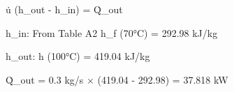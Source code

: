 u̇ (h_out - h_in) = Q̇_out  

h_in:  
From Table A2  
h_f (70°C) = 292.98 kJ/kg  

h_out:  
h (100°C) = 419.04 kJ/kg  

Q̇_out = 0.3 kg/s × (419.04 - 292.98)  
= 37.818 kW